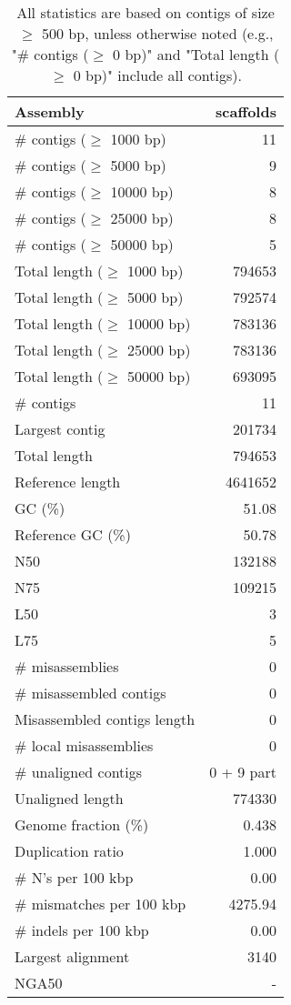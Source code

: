 \documentclass[12pt,a4paper]{article}
\begin{document}
\begin{table}[ht]
\begin{center}
\caption{All statistics are based on contigs of size $\geq$ 500 bp, unless otherwise noted (e.g., "\# contigs ($\geq$ 0 bp)" and "Total length ($\geq$ 0 bp)" include all contigs).}
\begin{tabular}{|l*{1}{|r}|}
\hline
Assembly & scaffolds \\ \hline
\# contigs ($\geq$ 1000 bp) & 11 \\ \hline
\# contigs ($\geq$ 5000 bp) & 9 \\ \hline
\# contigs ($\geq$ 10000 bp) & 8 \\ \hline
\# contigs ($\geq$ 25000 bp) & 8 \\ \hline
\# contigs ($\geq$ 50000 bp) & 5 \\ \hline
Total length ($\geq$ 1000 bp) & 794653 \\ \hline
Total length ($\geq$ 5000 bp) & 792574 \\ \hline
Total length ($\geq$ 10000 bp) & 783136 \\ \hline
Total length ($\geq$ 25000 bp) & 783136 \\ \hline
Total length ($\geq$ 50000 bp) & 693095 \\ \hline
\# contigs & 11 \\ \hline
Largest contig & 201734 \\ \hline
Total length & 794653 \\ \hline
Reference length & 4641652 \\ \hline
GC (\%) & 51.08 \\ \hline
Reference GC (\%) & 50.78 \\ \hline
N50 & 132188 \\ \hline
N75 & 109215 \\ \hline
L50 & 3 \\ \hline
L75 & 5 \\ \hline
\# misassemblies & 0 \\ \hline
\# misassembled contigs & 0 \\ \hline
Misassembled contigs length & 0 \\ \hline
\# local misassemblies & 0 \\ \hline
\# unaligned contigs & 0 + 9 part \\ \hline
Unaligned length & 774330 \\ \hline
Genome fraction (\%) & 0.438 \\ \hline
Duplication ratio & 1.000 \\ \hline
\# N's per 100 kbp & 0.00 \\ \hline
\# mismatches per 100 kbp & 4275.94 \\ \hline
\# indels per 100 kbp & 0.00 \\ \hline
Largest alignment & 3140 \\ \hline
NGA50 & - \\ \hline
\end{tabular}
\end{center}
\end{table}
\end{document}
